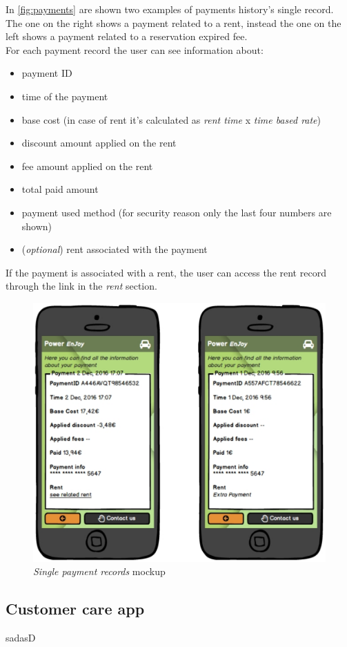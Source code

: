 In \autoref{fig:payments} are shown two examples of payments history's single record. The one on the right shows a payment related to a rent, instead the one on the left shows a payment related to a reservation expired fee. \\

For each payment record the user can see information about:
\begin{itemize}
	\item payment ID
	\item time of the payment
	\item base cost (in case of rent it's calculated as \emph{rent time} x \emph{time based rate})
	\item discount amount applied on the rent 
	\item fee amount applied on the rent
	\item total paid amount
	\item payment used method (for security reason only the last four numbers are shown)
	\item (\emph{optional}) rent associated with the payment
\end{itemize}

If the payment is associated with a rent, the user can access the rent record through the link in the \emph{rent} section.
\\
 
\begin{figure}[h]
			\centering
			\includegraphics[width=0.9\linewidth]{mockups/payments}
			\caption{
				\label{fig:payments} 
				\emph{Single payment records} mockup
			}
		\end{figure}

\clearpage


\subsection{Customer care app}
sadasD